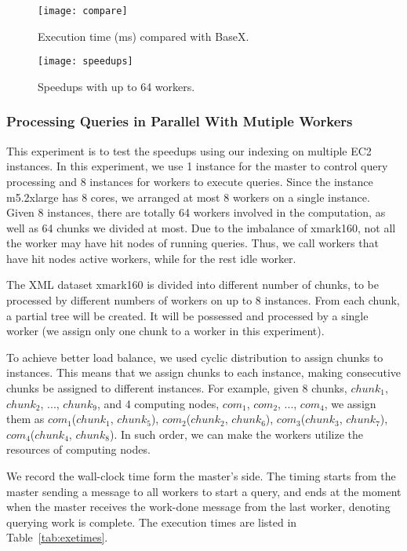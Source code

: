 \begin{figure}[thb]
	\centering
	\texttt{[image: compare]}
	\label{fig:compare}       %
	\caption{Execution time (ms) compared with BaseX.}
\end{figure}

\begin{figure}[thb]
	\centering
	\texttt{[image: speedups]}
	\caption{Speedups with up to 64 workers.}
	\label{fig:speedups}    
\end{figure}


\subsubsection{Processing Queries in Parallel With Mutiple Workers}

This experiment is to test the speedups using our indexing on multiple EC2
instances. In this experiment, we use 1 instance for the master to control
query processing and 8 instances for workers to execute queries. Since the
instance m5.2xlarge has 8 cores, we arranged at most 8 workers on a single
instance. Given 8 instances, there are totally 64 workers involved in the
computation, as well as 64 chunks we divided at most. Due to the imbalance of
xmark160, not all the worker may have hit nodes of running queries. Thus, we
call workers that have hit nodes active workers, while for the rest idle
worker. 

The XML dataset xmark160 is divided into different number of chunks, to be
processed by different numbers of workers on up to 8 instances. From each chunk,
a partial tree will be created. It will be possessed and processed by a single
worker (we assign only one chunk to a worker in this experiment). 

To achieve better load balance, we used cyclic distribution to assign chunks to
instances. This means that we assign chunks to each instance, making consecutive
chunks be assigned to different instances. For example, given 8 chunks, $chunk_1$,
$chunk_2$, ..., $chunk_9$,  and 4 computing nodes, $com_1$, $com_2$, ..., $com_4$, 
we assign them as 
$com_1$($chunk_1$, $chunk_5$), 
$com_2$($chunk_2$, $chunk_6$), 
$com_3$($chunk_3$, $chunk_7$), 
$com_4$($chunk_4$, $chunk_8$). 
In such order, we can make the workers utilize the resources of computing nodes. 

We record the wall-clock time form the master's side. The timing starts from the
master sending a message to all workers to start a query, and ends at the moment
when the master receives the work-done message from the last worker, denoting
querying work is complete. The execution times are listed in
Table~\ref{tab:exetimes}.


